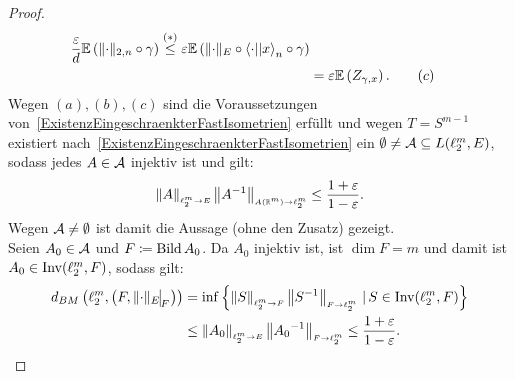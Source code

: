 \begin{proof}
\begin{align*}
\frac {\varepsilon} d\mathbb{E}\left(\lVert\cdot\rVert_{2,n} \circ \gamma \right)
\overset{(\ast)}\le 
\varepsilon \mathbb{E}\left(\lVert\cdot\rVert_E \circ \left\langle \cdot ||x\right\rangle_n \circ \gamma \right)\\
&= \varepsilon\mathbb{E}\left(Z_{\gamma,x} \right)\text.\tag {$c$}
\end{align*}
Wegen $(a), (b), (c)$ sind die Voraussetzungen von~\ref{ExistenzEingeschraenkterFastIsometrien} erfüllt und wegen $T = S^{m-1}$
existiert nach~\ref{ExistenzEingeschraenkterFastIsometrien} ein
$\emptyset \neq \mathcal{A} \subseteq L(\ell_2^m, E)$, sodass jedes $A \in \mathcal{A}$
injektiv ist und gilt:
\[\left\|A\right\|_{\scriptscriptstyle{\ell_2^m \rightarrow E}} \left\|A^{-1}\right\|_{\scriptscriptstyle{A(\ensuremath{\mathbb{R}}^m) \rightarrow \ell_2^m}} \le
\frac {1+\varepsilon}{1-\varepsilon}\text{.}\]
Wegen $\mathcal{A} \neq \emptyset$ ist damit die Aussage (ohne den Zusatz) gezeigt.\\
Seien $A_0 \in \mathcal{A}$ und $F\coloneqq  \mathop{\textrm{Bild}}\nolimits A_0$. Da $A_0$ injektiv ist, ist
$\dim F = m$ und damit ist $A_0 \in \mathop{\textrm{Inv}}\nolimits(\ell_2^m, F)$, sodass gilt:
\begin{align*}
d_{BM}\left(\ell_2^m, \left(F, \restrict{\norm\cdot_E}F\right) \right)
&= \inf\menge{\opnorm S {\ell_2^m}{F}\opnorm {S\inv}F{\ell_2^m}}
{S \in \Inv(\ell_2^m, F)}\\
& \le \opnorm {A_0} {\ell_2^m}E \opnorm{{A_0}\inv}{F}{\ell_2^m}
\le \frac {1+\eps}{1-\eps}\text.
\end{align*}
\end{proof}